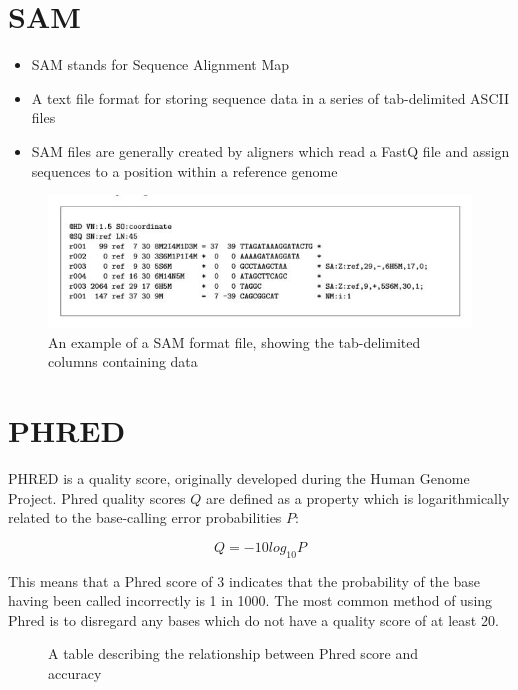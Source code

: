 \documentclass[12pt]{report}
\begin{document}
\section*{SAM}
\begin{itemize}
	\item SAM stands for Sequence Alignment Map
	\item A text file format for storing sequence data in a series of tab-delimited ASCII files
	\item SAM files are generally created by aligners which read a FastQ file and assign sequences to a position within a reference genome
\end{itemize}

\begin{figure}[ht]
	\centering
	\includegraphics{SAM}
	\caption{An example of a SAM format file, showing the tab-delimited columns containing data}\label{SAM}
\end{figure}

\section*{PHRED}
PHRED is a quality score, originally developed during the Human Genome Project. Phred quality scores $\displaystyle Q$ are defined as a property which is logarithmically related to the base-calling error probabilities $\displaystyle P$:

\begin{figure}[h]
	\begin{equation}
		Q = -10 log_{10} P
	\end{equation}
\end{figure} 

This means that a Phred score of 3 indicates that the probability of the base having been called incorrectly is 1 in 1000. The most common method of using Phred is to disregard any bases which do not have a quality score of at least 20.

\begin{figure}[ht]
	\centering
	\caption{A table describing the relationship between Phred score and accuracy}\label{Phred}
\end{figure}
\end{document}
